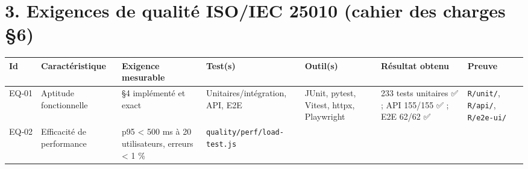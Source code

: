 \documentclass[
  11pt,
]{article}
\begin{document}
\section{3. Exigences de qualité ISO/IEC 25010 (cahier des charges
§6)}\label{3-exigences-de-qualituxe9-isoiec-25010-cahier-des-charges-6}

\begin{longtable}[]{@{}
  >{\raggedright\arraybackslash}p{}
  >{\raggedright\arraybackslash}p{}
  >{\raggedright\arraybackslash}p{}
  >{\raggedright\arraybackslash}p{}
  >{\raggedright\arraybackslash}p{}
  >{\raggedright\arraybackslash}p{}
  >{\raggedright\arraybackslash}p{}@{}}
\toprule\noalign{}
\begin{minipage}[b]{\linewidth}\raggedright
Id
\end{minipage} & \begin{minipage}[b]{\linewidth}\raggedright
Caractéristique
\end{minipage} & \begin{minipage}[b]{\linewidth}\raggedright
Exigence mesurable
\end{minipage} & \begin{minipage}[b]{\linewidth}\raggedright
Test(s)
\end{minipage} & \begin{minipage}[b]{\linewidth}\raggedright
Outil(s)
\end{minipage} & \begin{minipage}[b]{\linewidth}\raggedright
Résultat obtenu
\end{minipage} & \begin{minipage}[b]{\linewidth}\raggedright
Preuve
\end{minipage} \\
\midrule\noalign{}
\endhead
\bottomrule\noalign{}
\endlastfoot
EQ‑01 & Aptitude fonctionnelle & §4 implémenté et exact &
Unitaires/intégration, API, E2E & JUnit, pytest, Vitest, httpx,
Playwright & 1 233 tests unitaires ✅ ; API 155/155 ✅ ; E2E 62/62 ✅ &
\texttt{R/unit/}, \texttt{R/api/}, \texttt{R/e2e-ui/} \\
EQ‑02 & Efficacité de performance & p95 \textless{} 500 ms à 20
utilisateurs, erreurs \textless{} 1 \% &
\texttt{quality/}\allowbreak{}\texttt{perf/}\allowbreak{}\texttt{load-}\allowbreak{}\texttt{test.}\allowbreak{}\texttt{js}

\end{longtable}
\end{document}

